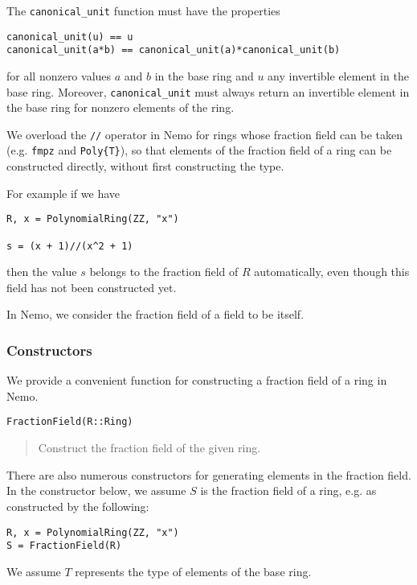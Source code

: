 \documentclass[a4paper,10pt]{article}
\newcommand{\code}{\lstinline}
\newcommand{\desc}[1]{\vspace{-3mm}\begin{quote}#1\end{quote}}
\begin{document}
The \code{canonical_unit} function must have the properties

\begin{lstlisting}
canonical_unit(u) == u
canonical_unit(a*b) == canonical_unit(a)*canonical_unit(b)
\end{lstlisting}

for all nonzero values $a$ and $b$ in the base ring and $u$ any invertible element
in the base ring. Moreover, \code{canonical_unit} must always return an invertible
element in the base ring for nonzero elements of the ring.

We overload the \code{//} operator in Nemo for rings whose fraction field can
be taken (e.g. \code{fmpz} and \code|Poly{T}|), so that elements of the
fraction field of a ring can be constructed directly, without first
constructing the type.

For example if we have

\begin{lstlisting}
R, x = PolynomialRing(ZZ, "x")

s = (x + 1)//(x^2 + 1)
\end{lstlisting}

then the value $s$ belongs to the fraction field of $R$ automatically, even
though this field has not been constructed yet.

In Nemo, we consider the fraction field of a field to be itself.

\subsubsection{Constructors}

We provide a convenient function for constructing a fraction field of a ring in
Nemo.

\begin{lstlisting}
FractionField(R::Ring)
\end{lstlisting}

\desc{Construct the fraction field of the given ring.}

There are also numerous constructors for generating elements in the fraction
field. In the constructor below, we assume $S$ is the fraction field of a ring,
e.g. as constructed by the following:

\begin{lstlisting}
R, x = PolynomialRing(ZZ, "x")
S = FractionField(R)
\end{lstlisting}

We assume $T$ represents the type of elements of the base ring.
\end{document}
